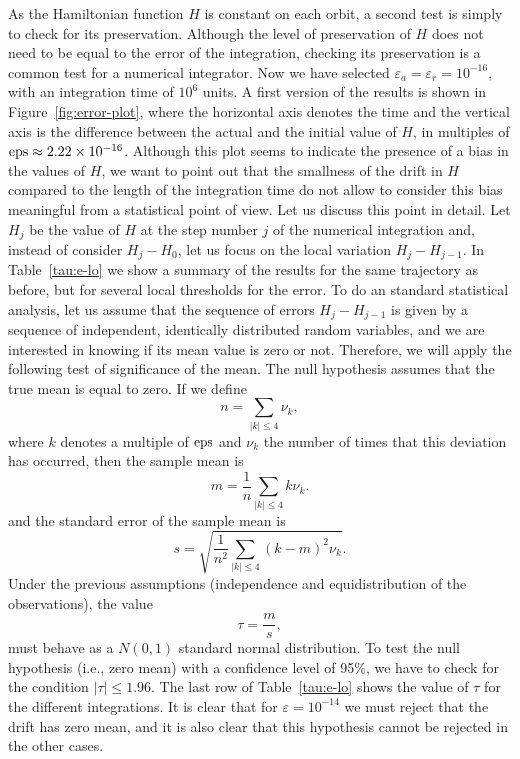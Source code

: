 \documentclass[12pt,twoside]{article}
\newcommand{\eps}{\mbox{\rm eps}}
\begin{document}
As the Hamiltonian function $H$ is constant on each orbit, a second
test is simply to check for its preservation. Although the level of
preservation of $H$ does not need to be equal to the error of the
integration, checking its preservation is a common test for a
numerical integrator. Now we have selected
$\varepsilon_a=\varepsilon_r=10^{-16}$, with an integration time
of $10^6$ units. A first version of the results is shown in
Figure~\ref{fig:error-plot}, where the horizontal axis denotes the
time and the vertical axis is the difference between the actual and
the initial value of $H$, in multiples of $\eps\approx 2.22\times
10^{-16}$. Although this plot seems to indicate the presence of a bias
in the values of $H$, we want to point out that the smallness of the
drift in $H$ compared to the length of the integration time do not
allow to consider this bias meaningful from a statistical point of
view. Let us discuss this point in detail. Let $H_j$ be the value of
$H$ at the step number $j$ of the numerical integration and, instead
of consider $H_j-H_0$, let us focus on the local variation
$H_j-H_{j-1}$. In Table~\ref{tau:e-lo} we show a summary of the
results for the same trajectory as before, but for several local
thresholds for the error. To do an standard statistical analysis, let
us assume that the sequence of errors $H_j-H_{j-1}$ is given by a
sequence of independent, identically distributed random variables, and
we are interested in knowing if its mean value is zero or not.
Therefore, we will apply the following test of significance of the
mean. The null hypothesis assumes that the true mean is equal to zero.
If we define
\[
n=\sum_{|k|\le 4} \nu_k,
\]
where $k$ denotes a multiple of $\eps$ and $\nu_k$ the number of times
that this deviation has occurred, then the sample mean is
\[
m=\frac{1}{n}\sum_{|k|\le 4} k\nu_k.
\]
and the standard error of the sample mean is
\[
s=\sqrt{\frac{1}{n^2}\sum_{|k|\le 4} (k-m)^2\nu_k}.
\]
Under the previous assumptions (independence and equidistribution of
the observations), the value
\[
\tau=\frac{m}{s},
\]
must behave as a $N(0,1)$ standard normal distribution. To test the
null hypothesis (i.e., zero mean) with a confidence level of 95\%, we
have to check for the condition $|\tau|\le 1.96$. The last row of
Table~\ref{tau:e-lo} shows the value of $\tau$ for the different
integrations. It is clear that for $\varepsilon=10^{-14}$ we must
reject that the drift has zero mean, and it is also clear that this
hypothesis cannot be rejected in the other cases.
\end{document}
